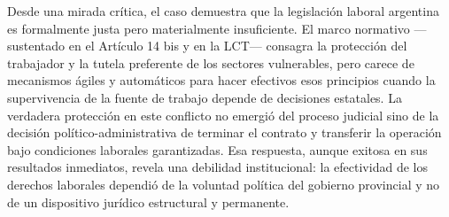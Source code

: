 \documentclass[]{informeutn}
\begin{document}
    Desde una mirada crítica, el caso demuestra que la legislación laboral argentina es formalmente justa pero
    materialmente insuficiente. El marco normativo —sustentado en el Artículo 14 bis y en la LCT— consagra la protección
    del trabajador y la tutela preferente de los sectores vulnerables, pero carece de mecanismos ágiles y automáticos
    para hacer efectivos esos principios cuando la supervivencia de la fuente de trabajo depende de decisiones
    estatales. La verdadera protección en este conflicto no emergió del proceso judicial sino de la decisión
    político-administrativa de terminar el contrato y transferir la operación bajo condiciones laborales garantizadas.
    Esa respuesta, aunque exitosa en sus resultados inmediatos, revela una debilidad institucional: la efectividad de
    los derechos laborales dependió de la voluntad política del gobierno provincial y no de un dispositivo jurídico
    estructural y permanente.
\end{document}
